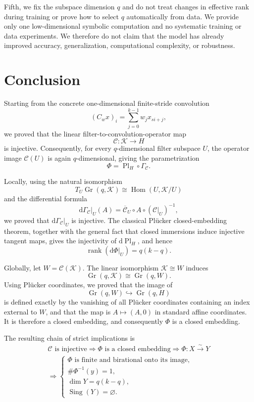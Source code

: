 \documentclass{siamonline250211}
\newcommand{\Gr}{\operatorname{Gr}}
\newcommand{\Pl}{\operatorname{Pl}}
\newcommand{\Hom}{\operatorname{Hom}}
\newcommand{\rank}{\operatorname{rank}}
\newcommand{\Sing}{\operatorname{Sing}}
\newcommand{\cK}{\mathcal K}
\newcommand{\cC}{\mathcal C}
\newcommand{\dd}{\mathrm d}
\begin{document}
Fifth, we fix the subspace dimension $q$ and do not treat changes in effective
rank during training or prove how to select $q$ automatically from data. We
provide only one low-dimensional symbolic computation and no systematic
training or data experiments. We therefore do not claim that the model has
already improved accuracy, generalization, computational complexity, or
robustness.

\section{Conclusion}

Starting from the concrete one-dimensional finite-stride convolution
\[
  (C_wx)_i=\sum_{j=0}^{k-1}w_jx_{si+j},
\]
we proved that the linear filter-to-convolution-operator map
\[
  \cC:\cK\longrightarrow H
\]
is injective. Consequently, for every $q$-dimensional filter subspace $U$, the
operator image $\cC(U)$ is again $q$-dimensional, giving the parametrization
\[
  \Phi=\Pl_H\circ\Gamma_{\cC}.
\]

Locally, using the natural isomorphism
\[
  T_U\Gr(q,\cK)\cong\Hom(U,\cK/U)
\]
and the differential formula
\[
  \dd\Gamma_{\cC}|_U(A)
  =\overline{\cC}_U\circ A\circ(\cC|_U)^{-1},
\]
we proved that $\dd\Gamma_{\cC}|_U$ is injective. The classical Pl\"ucker
closed-embedding theorem, together with the general fact that closed immersions
induce injective tangent maps, gives the injectivity of $\dd\Pl_H$, and hence
\[
  \rank(\dd\Phi|_U)=q(k-q).
\]

Globally, let $W=\cC(\cK)$. The linear isomorphism $\cK\cong W$ induces
\[
  \Gr(q,\cK)\cong\Gr(q,W).
\]
Using Pl\"ucker coordinates, we proved that the image of
\[
  \Gr(q,W)\hookrightarrow\Gr(q,H)
\]
is defined exactly by the vanishing of all Pl\"ucker coordinates containing an
index external to $W$, and that the map is $A\mapsto(A,0)$ in standard affine
coordinates. It is therefore a closed embedding, and consequently $\Phi$ is a
closed embedding.

The resulting chain of strict implications is
\[
  \begin{gathered}
  \cC\text{ is injective}
  \Longrightarrow
  \Phi\text{ is a closed embedding}
  \Longrightarrow
  \Phi:X\xrightarrow{\sim}Y\\
  \Longrightarrow
  \begin{cases}
    \Phi\text{ is finite and birational onto its image},\\
    \#\Phi^{-1}(y)=1,\\
    \dim Y=q(k-q),\\
    \Sing(Y)=\varnothing.
  \end{cases}
  \end{gathered}
\]
\end{document}
